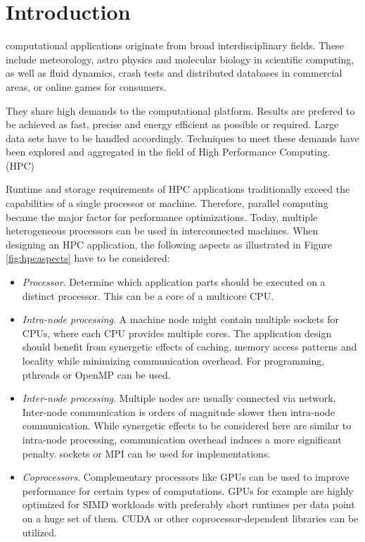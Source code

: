 \section{Introduction}

 computational applications originate from broad interdisciplinary fields. These include meteorology, astro physics and molecular biology in scientific computing, as well as fluid dynamics, crash tests and distributed databases in commercial areas, or online games for consumers.

They share high demands to the computational platform. Results are prefered to be achieved as fast, precise and energy efficient as possible or required. Large data sets have to be handled accordingly. Techniques to meet these demands have been explored and aggregated in the field of High Performance Computing. (HPC)

Runtime and storage requirements of HPC applications traditionally exceed the capabilities of a single processor or machine. Therefore, parallel computing became the major factor for performance optimizations. Today, multiple heterogeneous processors can be used in interconnected machines. When designing an HPC application, the following aspects as illustrated in Figure \ref{fig:hpcaspects} have to be considered:

\begin{itemize}

\item \textit{Processor}. Determine which application parts should be executed on a distinct processor. This can be a core of a multicore CPU.

\item \textit{Intra-node processing}. A machine node might contain multiple sockets for CPUs, where each CPU provides multiple cores. The application design should benefit from synergetic effects of caching, memory access patterns and locality while minimizing communication overhead. For programming, pthreads or OpenMP can be used.

\item \textit{Inter-node processing}. Multiple nodes are usually connected via network. Inter-node communication is orders of magnitude slower then intra-node communication. While synergetic effects to be considered here are similar to intra-node processing, communication overhead induces a more significant penalty. sockets or MPI can be used for implementations.

\item \textit{Coprocessors}. Complementary processors like GPUs can be used to improve performance for certain types of computations. GPUs for example are highly optimized for SIMD workloads with preferably short runtimes per data point on a huge set of them. CUDA or other coprocessor-dependent libraries can be utilized.

\end{itemize}

